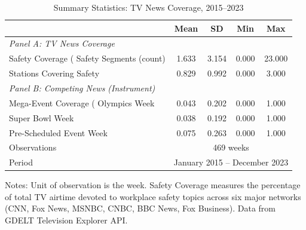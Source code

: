 \begin{table}[htbp]
\centering
\caption{Summary Statistics: TV News Coverage, 2015--2023}
\label{tab:summary}
\begin{tabular}{lcccc}
\hline\hline
 & Mean & SD & Min & Max \\
\hline
\emph{Panel A: TV News Coverage} & & & & \\
Safety Coverage (%
Safety Segments (count) & 1.633 & 3.154 & 0.000 & 23.000 \\
Stations Covering Safety & 0.829 & 0.992 & 0.000 & 3.000 \\
[0.5em]
\emph{Panel B: Competing News (Instrument)} & & & & \\
Mega-Event Coverage (%
Olympics Week & 0.043 & 0.202 & 0.000 & 1.000 \\
Super Bowl Week & 0.038 & 0.192 & 0.000 & 1.000 \\
Pre-Scheduled Event Week & 0.075 & 0.263 & 0.000 & 1.000 \\
\hline
Observations & \multicolumn{4}{c}{469 weeks} \\
Period & \multicolumn{4}{c}{January 2015 -- December 2023} \\
\hline\hline
\end{tabular}
\begin{flushleft}\small
Notes: Unit of observation is the week. Safety Coverage measures the percentage of total TV airtime devoted to workplace safety topics across six major networks (CNN, Fox News, MSNBC, CNBC, BBC News, Fox Business). Data from GDELT Television Explorer API.
\end{flushleft}
\end{table}

